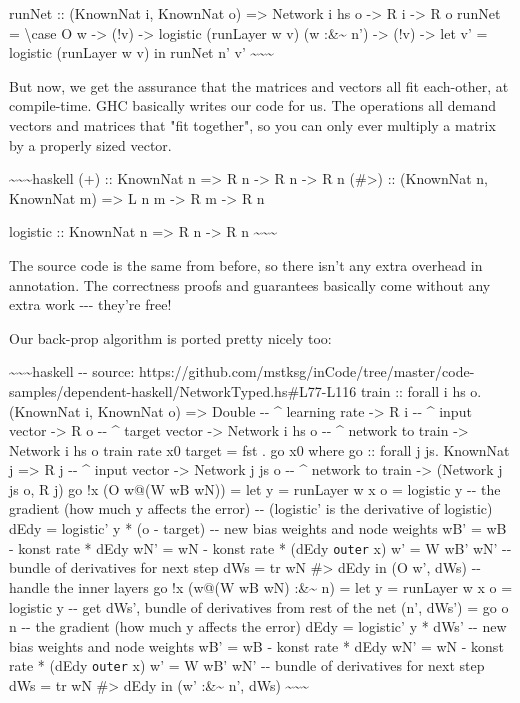 \documentclass[]{article}
\begin{document}
runNet :: (KnownNat i, KnownNat o) =\textgreater{} Network i hs o
-\textgreater{} R i -\textgreater{} R o runNet = \textbackslash{}case O w
-\textgreater{} (!v) -\textgreater{} logistic (runLayer w v) (w
:\&\textasciitilde{} n') -\textgreater{} (!v) -\textgreater{} let v' = logistic
(runLayer w v) in runNet n' v'
\textasciitilde{}\textasciitilde{}\textasciitilde{}

But now, we get the assurance that the matrices and vectors all fit each-other,
at compile-time. GHC basically writes our code for us. The operations all demand
vectors and matrices that "fit together", so you can only ever multiply a matrix
by a properly sized vector.

\textasciitilde{}\textasciitilde{}\textasciitilde{}haskell (+) :: KnownNat n
=\textgreater{} R n -\textgreater{} R n -\textgreater{} R n (\#\textgreater{})
:: (KnownNat n, KnownNat m) =\textgreater{} L n m -\textgreater{} R m
-\textgreater{} R n

logistic :: KnownNat n =\textgreater{} R n -\textgreater{} R n
\textasciitilde{}\textasciitilde{}\textasciitilde{}

The source code is the same from before, so there isn't any extra overhead in
annotation. The correctness proofs and guarantees basically come without any
extra work -\/-\/- they're free!

Our back-prop algorithm is ported pretty nicely too:

\textasciitilde{}\textasciitilde{}\textasciitilde{}haskell -\/- source:
https://github.com/mstksg/inCode/tree/master/code-samples/dependent-haskell/NetworkTyped.hs\#L77-L116
train :: forall i hs o. (KnownNat i, KnownNat o) =\textgreater{} Double -\/-
\^{} learning rate -\textgreater{} R i -\/- \^{} input vector -\textgreater{} R
o -\/- \^{} target vector -\textgreater{} Network i hs o -\/- \^{} network to
train -\textgreater{} Network i hs o train rate x0 target = fst . go x0 where go
:: forall j js. KnownNat j =\textgreater{} R j -\/- \^{} input vector
-\textgreater{} Network j js o -\/- \^{} network to train -\textgreater{}
(Network j js o, R j) go !x (O w@(W wB wN)) = let y = runLayer w x o = logistic
y -\/- the gradient (how much y affects the error) -\/- (logistic' is the
derivative of logistic) dEdy = logistic' y * (o - target) -\/- new bias weights
and node weights wB' = wB - konst rate * dEdy wN' = wN - konst rate * (dEdy
\texttt{outer} x) w' = W wB' wN' -\/- bundle of derivatives for next step dWs =
tr wN \#\textgreater{} dEdy in (O w', dWs) -\/- handle the inner layers go !x
(w@(W wB wN) :\&\textasciitilde{} n) = let y = runLayer w x o = logistic y -\/-
get dWs', bundle of derivatives from rest of the net (n', dWs') = go o n -\/-
the gradient (how much y affects the error) dEdy = logistic' y * dWs' -\/- new
bias weights and node weights wB' = wB - konst rate * dEdy wN' = wN - konst rate
* (dEdy \texttt{outer} x) w' = W wB' wN' -\/- bundle of derivatives for next
step dWs = tr wN \#\textgreater{} dEdy in (w' :\&\textasciitilde{} n', dWs)
\textasciitilde{}\textasciitilde{}\textasciitilde{}
\end{document}
